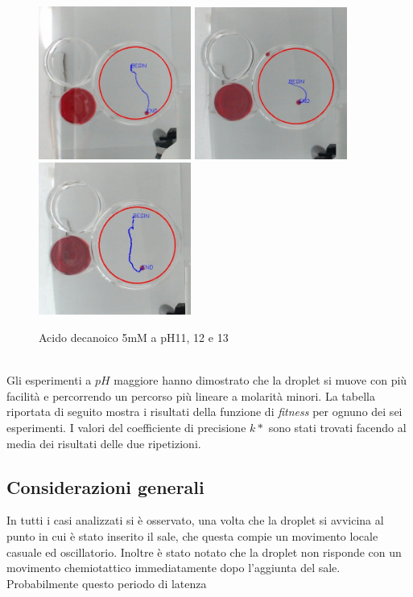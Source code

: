 \begin{figure}[h]
	\centering
   		{\includegraphics[width=5cm]{immagini/5mMpH11-1.jpg}} %
 	\hspace{2mm}   	
		{\includegraphics[width=5cm]{immagini/5mMpH11-2.jpg}}%
	\hspace{2mm}   	
		{\includegraphics[width=5cm]{immagini/5mMpH13-2.jpg}}%
	\caption{Acido decanoico 5mM a pH11, 12 e 13}
\end{figure}




\\Gli esperimenti a $pH$ maggiore hanno dimostrato che la droplet si muove con più facilità e percorrendo un percorso più lineare a molarità minori. 
La tabella riportata di seguito mostra i risultati della funzione di \emph{fitness} per ognuno dei sei esperimenti. I valori del coefficiente di precisione $k*$ sono stati trovati facendo al media dei risultati delle due ripetizioni. 


\subsection{Considerazioni generali}
In tutti i casi analizzati si è osservato, una volta che la droplet si avvicina al punto in cui è stato inserito il sale, che questa compie un movimento locale casuale ed oscillatorio.
Inoltre è stato notato che la droplet non risponde con un movimento chemiotattico immediatamente dopo l'aggiunta del sale. Probabilmente questo periodo di latenza 


